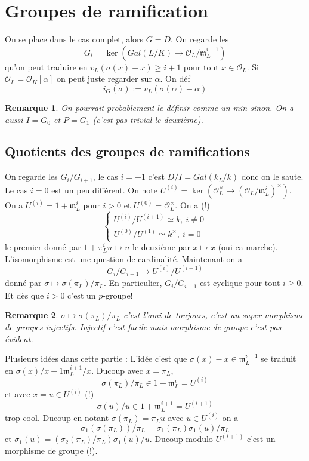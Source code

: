 \documentclass[a4paper,12pt]{book}
\newcommand{\Or}{\mathcal{O}}
\newcommand{\m}{\mathfrak m}
\theoremstyle{plain}
\newtheorem{rem}{Remarque}
\theoremstyle{definition}
\theoremstyle{remark}
\begin{document}
\section{Groupes de ramification}
On se place dans le cas complet, alors $G=D$.
On regarde les 
\[G_i=\ker(Gal(L/K)\to \Or_L/\m_L^{i+1})\]
qu'on peut traduire en $v_L(\sigma(x)-x)\geq i+1$ pour tout 
$x\in \Or_L$. Si $\Or_L=\Or_K[\alpha]$ on peut juste regarder
sur $\alpha$. On déf \[i_G(\sigma):=v_L(\sigma(\alpha)-\alpha)\]
\begin{rem}
    On pourrait probablement le définir comme un min sinon.
    On a aussi $I=G_0$ et $P=G_1$ (c'est pas trivial le deuxième).
\end{rem}

\subsection{Quotients des groupes de ramifications}
On regarde les $G_i/G_{i+1}$, le cas $i=-1$ c'est $D/I=Gal(k_L/k)$
donc on le saute. Le cas $i=0$ est un peu différent. On note
$U^{(i)}=\ker(\Or_L^\times\to (\Or_L/\m_L^i)^\times)$. On a
$U^{(i)}=1+\m_L^i$ pour $i>0$ et $U^{(0)}=\Or_L^\times$. On a (!)
\[\begin{cases}
    U^{(i)}/U^{(i+1)}\simeq k,~i\ne 0\\
    U^{(0)}/U^{(1)}\simeq k^\times,~i=0
\end{cases}\]
le premier donné par $1+\pi_L^iu\mapsto u$ le deuxième par
$x\mapsto x$ (oui ca marche). L'isomorphisme est une question
de cardinalité. Maintenant on a 
\[G_{i}/G_{i+1}\to U^{(i)}/U^{(i+1)}\]
donné par $\sigma \mapsto \sigma(\pi_L)/\pi_L$. En particulier,
$G_{i}/G_{i+1}$ est cyclique pour tout $i\geq 0$. Et dès que
$i>0$ c'est un $p$-groupe! 
\begin{rem}
    $\sigma\mapsto \sigma(\pi_L)/\pi_L$ c'est l'ami de toujours,
    c'est un super morphisme de groupes injectifs. Injectif c'est
    facile mais morphisme de groupe c'est pas évident.
\end{rem}
Plusieurs idées dans cette partie : L'idée c'est que 
$\sigma(x)-x\in \m_L^{i+1}$ se traduit en 
$\sigma(x)/x-1\m_L^{i+1}/x$. Ducoup avec $x=\pi_L$, 
\[\sigma(\pi_L)/\pi_L\in 1+\m_L^i=U^{(i)}\]
et avec $x=u\in U^{(i)}$ (!)
\[\sigma(u)/u\in 1+\m_L^{i+1}=U^{(i+1)}\]
trop cool. Ducoup en notant $\sigma(\pi_L)=\pi_Lu$ avec 
$u\in U^{(i)}$ on a 
\[\sigma_1(\sigma(\pi_L))/\pi_L=\sigma_1(\pi_L)\sigma_1(u)/\pi_L\]
et $\sigma_1(u)=(\sigma_2(\pi_L)/\pi_L)\sigma_1(u)/u$. Ducoup 
modulo $U^{(i+1)}$ c'est un morphisme de groupe (!).
\end{document}
